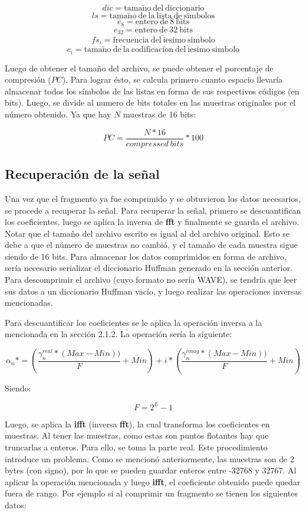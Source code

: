 \documentclass[12pt,a4paper]{article}
\begin{document}
$$ dic = \mathrm{tama\tilde{n}o\ del\ diccionario}$$
$$ ls = \mathrm{tama\tilde{n}o\ de\ la\ lista\ de\ s\acute{i}mbolos}$$
$$ e_8 = \mathrm{entero\ de\ 8\ bits}$$
$$ e_{32} = \mathrm{entero\ de\ 32\ bits} $$
$$ fs_i = \mathrm{frecuencia\ del\ \acute{i}esimo\ simbolo} $$
$$ c_i = \mathrm{tama\tilde{n}o\ de\ la\ codificaci\acute{o}n\ del\ \acute{i}esimo\ simbolo} $$

  Luego de obtener  el tamaño del archivo, se puede obtener el porcentaje de compresión ($PC$). Para lograr ésto, se calcula primero cuanto espacio llevaría almacenar todos los símbolos de las listas en forma de sus respectivos códigos (en bits).  Luego, se divide al numero de bits totales en las muestras originales por el número obtenido.  Ya que hay $N$ muestras de 16 bits:

$$ PC = \frac{N*16}{compressed\ bits} * 100$$

\subsection{Recuperación de la señal}

      Una vez que el fragmento ya fue comprimido y se obtuvieron los datos necesarios, se procede a recuperar la señal. Para recuperar la señal, primero se descuantifican los coeficientes, luego se aplica la inversa de \textbf{fft} y finalmente se guarda el archivo.  Notar que el tamaño del archivo escrito es igual al del archivo original.  Esto se debe a que el número de muestras no cambió, y el tamaño de cada muestra sigue siendo de 16 bits.  Para almacenar los datos comprimidos en forma de archivo, sería necesario serializar el diccionario Huffman generado en la sección anterior.  Para descomprimir el archivo (cuyo formato no sería WAVE), se tendría que leer sus datos a un diccionario Huffman vacío, y luego realizar las operaciones inversas mencionadas.

      Para descuantificar los coeficientes se le aplica la operación inversa a la mencionada en la sección 2.1.2. La operación sería la siguiente: 
      
$$\alpha_n* = (\frac{\gamma^{real}_n*(Max - Min))}{F} + Min) + i*(\frac{\gamma^{imag}_n*(Max - Min))}{F} + Min)$$
      
	Siendo:
      
$$F = 2^L - 1$$
      
      Luego, se aplica la \textbf{ifft} (inversa \textbf{fft}), la cual transforma los coeficientes en muestras. Al tener las muestras, como estas son puntos flotantes hay que truncarlas a enteros. Para ello, se toma la parte real.
      Este procedimiento introduce un problema. Como se mencionó anteriormente, las muestras son de 2 bytes (con signo), por lo que se pueden guardar enteros entre -32768 y 32767. Al aplicar la operación mencionada y luego \textbf{ifft}, el coeficiente obtenido puede quedar fuera de rango. Por ejemplo si al comprimir un fragmento se tienen los siguientes datos:
      
\end{document}
